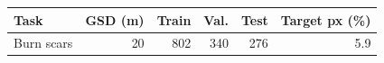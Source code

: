 \begin{tabular}{@{}lrrrrr@{}}
\toprule
Task & GSD (m) & Train & Val. & Test & Target px (\%) \\
\midrule
Burn scars & 20 & 802 & 340 & 276 & 5.9 \\
\bottomrule
\end{tabular}